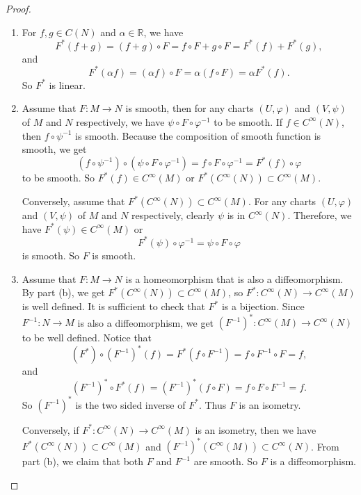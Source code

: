 \documentclass[12pt, a4paper]{article}
\theoremstyle{plain}
\newcommand{\R}{\mathbb{R}}
\def\phi{\varphi}
\begin{document}
    \begin{proof}
        \begin{enumerate}[label=(\alph*)]
            \item For $f,g\in C(N)$ and $\alpha\in \R$, we have
            \[
            F^*(f+g)=(f+g)\circ F=f\circ F+g\circ F=F^*(f)+F^*(g),
            \]
            and
            \[
            F^*(\alpha f)=(\alpha f)\circ F = \alpha (f\circ F) = \alpha F^*(f).
            \]
            So $F^*$ is linear.
            \item Assume that $F\colon M\to N$ is smooth, then for any charts $(U,\phi)$ and $(V,\psi)$ of $M$ and $N$ respectively, we have $\psi\circ F\circ \phi^{-1}$ to be smooth. If $f\in C^{\infty}(N)$, then $f\circ \psi^{-1}$ is smooth. Because the composition of smooth function is smooth, we get
            \[
            (f\circ \psi^{-1})\circ (\psi\circ F\circ \phi^{-1})=f\circ F\circ \phi^{-1}=F^*(f)\circ \phi
            \]
            to be smooth. So $F^*(f)\in C^{\infty}(M)$ or $F^*(C^{\infty}(N))\subset C^{\infty}(M)$.

            Conversely, assume that $F^*(C^{\infty}(N))\subset C^{\infty}(M)$. For any charts $(U,\phi)$ and $(V,\psi)$ of $M$ and $N$ respectively, clearly $\psi$ is in $C^{\infty}(N)$. Therefore, we have $F^*(\psi)\in C^{\infty}(M)$ or 
            \[
            F^*(\psi)\circ \phi^{-1} = \psi\circ F\circ \phi
            \]
            is smooth. So $F$ is smooth.
            \item Assume that $F\colon M\to N$ is a homeomorphism that is also a diffeomorphism. By part (b), we get $F^*(C^\infty(N))\subset C^{\infty}(M)$, so $F^*\colon C^{\infty}(N)\to C^{\infty}(M)$ is well defined. It is sufficient to check that $F^*$ is a bijection. Since $F^{-1}\colon N\to M$ is also a diffeomorphism, we get $(F^{-1})^*\colon C^\infty(M)\to C^\infty(N)$ to be well defined. Notice that
            \[
            (F^*)\circ (F^{-1})^*(f)=F^*(f\circ F^{-1})=f\circ F^{-1}\circ F = f,
            \]
            and
            \[
            (F^{-1})^*\circ F^*(f)=(F^{-1})^*(f\circ F)=f\circ F\circ F^{-1}=f.
            \]
            So $(F^{-1})^*$ is the two sided inverse of $F^*$. Thus $F$ is an isometry.

            Conversely, if $F^*\colon C^\infty(N)\to C^\infty(M)$ is an isometry, then we have $F^*(C^{\infty}(N))\subset C^{\infty}(M)$ and $(F^{-1})^*(C^\infty(M))\subset C^\infty(N)$. From part (b), we claim that both $F$ and $F^{-1}$ are smooth. So $F$ is a diffeomorphism.
        \end{enumerate}
    \end{proof}
\end{document}
